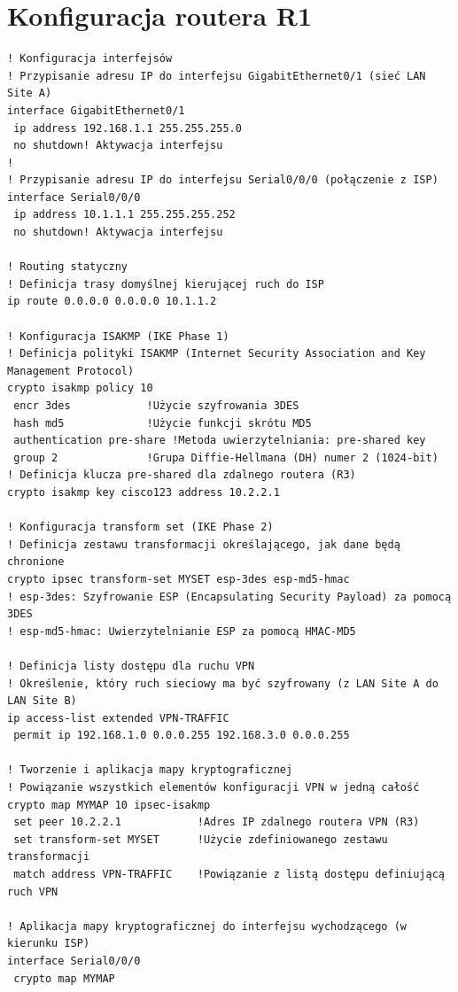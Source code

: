 \documentclass[12pt,twoside,a4paper,openany]{article}
\begin{document}
\section{Konfiguracja routera R1}
\begin{lstlisting}[caption={Konfiguracja podstawowa i VPN na R1}]
! Konfiguracja interfejsów
! Przypisanie adresu IP do interfejsu GigabitEthernet0/1 (sieć LAN Site A)
interface GigabitEthernet0/1
 ip address 192.168.1.1 255.255.255.0
 no shutdown! Aktywacja interfejsu
!
! Przypisanie adresu IP do interfejsu Serial0/0/0 (połączenie z ISP)
interface Serial0/0/0
 ip address 10.1.1.1 255.255.255.252
 no shutdown! Aktywacja interfejsu

! Routing statyczny
! Definicja trasy domyślnej kierującej ruch do ISP
ip route 0.0.0.0 0.0.0.0 10.1.1.2

! Konfiguracja ISAKMP (IKE Phase 1)
! Definicja polityki ISAKMP (Internet Security Association and Key Management Protocol)
crypto isakmp policy 10
 encr 3des            !Użycie szyfrowania 3DES
 hash md5             !Użycie funkcji skrótu MD5
 authentication pre-share !Metoda uwierzytelniania: pre-shared key
 group 2              !Grupa Diffie-Hellmana (DH) numer 2 (1024-bit)
! Definicja klucza pre-shared dla zdalnego routera (R3)
crypto isakmp key cisco123 address 10.2.2.1

! Konfiguracja transform set (IKE Phase 2)
! Definicja zestawu transformacji określającego, jak dane będą chronione
crypto ipsec transform-set MYSET esp-3des esp-md5-hmac
! esp-3des: Szyfrowanie ESP (Encapsulating Security Payload) za pomocą 3DES
! esp-md5-hmac: Uwierzytelnianie ESP za pomocą HMAC-MD5

! Definicja listy dostępu dla ruchu VPN
! Określenie, który ruch sieciowy ma być szyfrowany (z LAN Site A do LAN Site B)
ip access-list extended VPN-TRAFFIC
 permit ip 192.168.1.0 0.0.0.255 192.168.3.0 0.0.0.255

! Tworzenie i aplikacja mapy kryptograficznej
! Powiązanie wszystkich elementów konfiguracji VPN w jedną całość
crypto map MYMAP 10 ipsec-isakmp
 set peer 10.2.2.1            !Adres IP zdalnego routera VPN (R3)
 set transform-set MYSET      !Użycie zdefiniowanego zestawu transformacji
 match address VPN-TRAFFIC    !Powiązanie z listą dostępu definiującą ruch VPN

! Aplikacja mapy kryptograficznej do interfejsu wychodzącego (w kierunku ISP)
interface Serial0/0/0
 crypto map MYMAP
\end{lstlisting}
\end{document}
